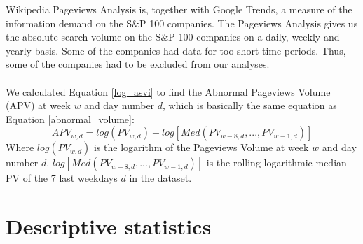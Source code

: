 Wikipedia Pageviews Analysis is, together with Google Trends, a measure of the information demand on the S\&P 100 companies. The Pageviews Analysis gives us the absolute search volume on the S\&P 100 companies on a daily, weekly and yearly basis. Some of the companies had data for too short time periods. Thus, some of the companies had to be excluded from our analyses. 
\\\\
We calculated Equation \eqref{log_asvi} to find the Abnormal Pageviews Volume (APV) at week $w$ and day number $d$, which is basically the same equation as Equation \eqref{abnormal_volume}:
\begin{equation}
   \label{abnormal_pageviews_volume} 
   APV_{w,d} = log(PV_{w,d}) - log[Med(PV_{w-8,d},...,PV_{w-1,d})] 
\end{equation}
   Where $log(PV_{w,d})$ is the logarithm of the Pageviews Volume at week $w$ and day number $d$. $log[Med(PV_{w-8,d},...,PV_{w-1,d})]$ is the rolling logarithmic median PV of the 7 last weekdays $d$ in the dataset.
   
   \section{Descriptive statistics}





